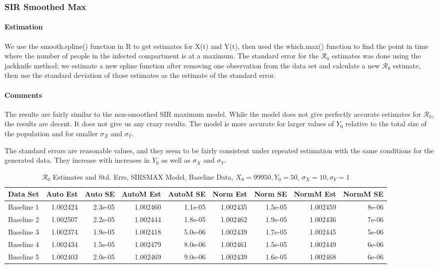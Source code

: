 \documentclass[12pt]{article}
\newcommand{\rr}{\ensuremath{\mathcal{R}_0}}
\begin{document}
\subsubsection{SIR Smoothed Max}

\paragraph{Estimation}

We use the smooth.spline() function in R to get estimates for X(t) and Y(t), then used the which.max() function to find the point in time where the number of people in the infected compartment is at a maximum. The standard error for the $\rr$ estimates was done using the jackknife method; we estimate a new spline function after removing one observation from the data set and calculate a new $\rr$ estimate, then use the standard deviation of those estimates as the estimate of the standard error.

\paragraph{Comments}

The results are fairly similar to the non-smoothed SIR maximum model.  While the model does not give perfectly accurate estimates for $\rr$, the results are decent. It does not give us any crazy results. The model is more accurate for larger values of $Y_0$ relative to the total size of the population and for smaller $\sigma_X$ and $\sigma_Y$.

The standard errors are reasonable values, and they seem to be fairly consistent under repeated estimation with the same conditions for the generated data.  They increase with increases in $Y_0$ as well as $\sigma_X$ and $\sigma_Y$.

\begin{table}[H]
	
	\caption{$\rr$ Estimates and Std. Errs, SIRSMAX Model,
		Baseline Data, $X_0 = 99950, Y_0 = 50$, 
		$\sigma_X = 10, \sigma_Y = 1$}
	\begin{footnotesize}
		\hskip -1cm
		\begin{tabular}{l|r|r|r|r|r|r|r|r}
			\hline
			Data Set & Auto Est & Auto SE & AutoM Est & AutoM SE & Norm Est & Norm SE & NormM Est & NormM SE\\
			\hline
			Baseline 1 & 1.002424 & 2.3e-05 & 1.002460 & 1.1e-05 & 1.002435 & 1.5e-05 & 1.002459 & 8e-06\\
			\hline
			Baseline 2 & 1.002507 & 2.2e-05 & 1.002444 & 1.8e-05 & 1.002462 & 1.9e-05 & 1.002436 & 7e-06\\
			\hline
			Baseline 3 & 1.002374 & 1.9e-05 & 1.002418 & 5.0e-06 & 1.002439 & 1.7e-05 & 1.002445 & 5e-06\\
			\hline
			Baseline 4 & 1.002434 & 1.5e-05 & 1.002479 & 8.0e-06 & 1.002461 & 1.5e-05 & 1.002449 & 6e-06\\
			\hline
			Baseline 5 & 1.002403 & 2.0e-05 & 1.002469 & 9.0e-06 & 1.002439 & 1.6e-05 & 1.002468 & 6e-06\\
			\hline
		\end{tabular}
	\end{footnotesize}
\end{table}
\end{document}
